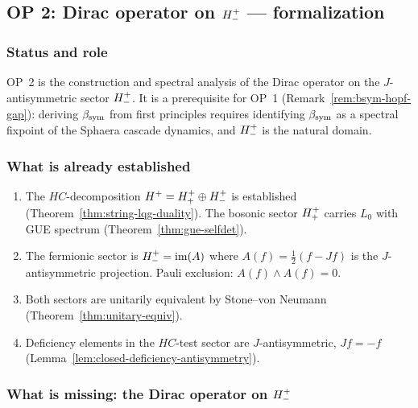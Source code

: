 \subsection{OP 2: Dirac operator on $H^+_-$ --- formalization}
\label{sec:op2}

\subsubsection{Status and role}

OP~2 is the construction and spectral analysis of the Dirac operator on
the $J$-antisymmetric sector $H^+_-$. It is a prerequisite for
OP~1 (Remark~\ref{rem:bsym-hopf-gap}): deriving $\beta_{\mathrm{sym}}$ from first
principles requires identifying $\beta_{\mathrm{sym}}$ as a spectral fixpoint of the
Sphaera cascade dynamics, and $H^+_-$ is the natural domain.

\subsubsection{What is already established}

\begin{enumerate}[label=(\arabic*)]
  \item The $HC$-decomposition $H^+ = H^+_+\oplus H^+_-$
    is established (Theorem~\ref{thm:string-lqg-duality}).
    The bosonic sector $H^+_+$ carries $L_0$ with GUE spectrum
    (Theorem~\ref{thm:gue-selfdet}).
  \item The fermionic sector is $H^+_- = \mathrm{im}(A)$ where
    $A(f)=\tfrac{1}{2}(f-Jf)$ is the $J$-antisymmetric projection.
    Pauli exclusion: $A(f)\wedge A(f)=0$.
  \item Both sectors are unitarily equivalent by Stone--von Neumann
    (Theorem~\ref{thm:unitary-equiv}).
  \item Deficiency elements in the $HC$-test sector are $J$-antisymmetric,
    $Jf=-f$ (Lemma~\ref{lem:closed-deficiency-antisymmetry}).
\end{enumerate}

\subsubsection{What is missing: the Dirac operator on $H^+_-$}

